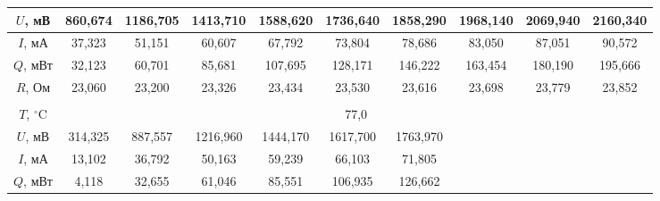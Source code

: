 \documentclass[a4paper, 12pt]{article}
\begin{document}
\begin{table}[H]
\begin{tabular}{|cccccccccc|}
                \multicolumn{1}{|c|}{$U$, мВ} & \multicolumn{1}{c|}{860,674} & \multicolumn{1}{c|}{1186,705} & \multicolumn{1}{c|}{1413,710} & \multicolumn{1}{c|}{1588,620} & \multicolumn{1}{c|}{1736,640} & \multicolumn{1}{c|}{1858,290} & \multicolumn{1}{c|}{1968,140} & \multicolumn{1}{c|}{2069,940} & \multicolumn{1}{c|}{2160,340} \\ \hline
                \multicolumn{1}{|c|}{$I$, мА} & \multicolumn{1}{c|}{37,323} & \multicolumn{1}{c|}{51,151}   & \multicolumn{1}{c|}{60,607} & \multicolumn{1}{c|}{67,792}   & \multicolumn{1}{c|}{73,804} & \multicolumn{1}{c|}{78,686}   & \multicolumn{1}{c|}{83,050} & \multicolumn{1}{c|}{87,051}   & \multicolumn{1}{c|}{90,572}   \\ \hline
                \multicolumn{1}{|c|}{$Q$, мВт} & \multicolumn{1}{c|}{32,123} & \multicolumn{1}{c|}{60,701}   & \multicolumn{1}{c|}{85,681} & \multicolumn{1}{c|}{107,695}  & \multicolumn{1}{c|}{128,171} & \multicolumn{1}{c|}{146,222}  & \multicolumn{1}{c|}{163,454} & \multicolumn{1}{c|}{180,190}  & \multicolumn{1}{c|}{195,666}  \\ \hline
                \multicolumn{1}{|c|}{$R$, Ом} & \multicolumn{1}{c|}{23,060} & \multicolumn{1}{c|}{23,200} & \multicolumn{1}{c|}{23,326} & \multicolumn{1}{c|}{23,434} & \multicolumn{1}{c|}{23,530} & \multicolumn{1}{c|}{23,616} & \multicolumn{1}{c|}{23,698} & \multicolumn{1}{c|}{23,779} & \multicolumn{1}{c|}{23,852} \\ \hline
                \multicolumn{10}{|c|}{} \\ \hline
                \multicolumn{1}{|c|}{$T$, $^\circ$C} & \multicolumn{9}{c|}{77,0} \\ \hline
                \multicolumn{1}{|c|}{$U$, мВ} & \multicolumn{1}{c|}{314,325} & \multicolumn{1}{c|}{887,557} & \multicolumn{1}{c|}{1216,960} & \multicolumn{1}{c|}{1444,170} & \multicolumn{1}{c|}{1617,700} & \multicolumn{1}{c|}{1763,970} & \multicolumn{1}{c|}{} & \multicolumn{1}{c|}{} & \multicolumn{1}{c|}{} \\ \hline
                \multicolumn{1}{|c|}{$I$, мА} & \multicolumn{1}{c|}{13,102} & \multicolumn{1}{c|}{36,792} & \multicolumn{1}{c|}{50,163} & \multicolumn{1}{c|}{59,239} & \multicolumn{1}{c|}{66,103} & \multicolumn{1}{c|}{71,805} & \multicolumn{1}{c|}{} & \multicolumn{1}{c|}{} & \multicolumn{1}{c|}{} \\ \hline
                \multicolumn{1}{|c|}{$Q$, мВт} & \multicolumn{1}{c|}{4,118} & \multicolumn{1}{c|}{32,655} & \multicolumn{1}{c|}{61,046} & \multicolumn{1}{c|}{85,551} & \multicolumn{1}{c|}{106,935} & \multicolumn{1}{c|}{126,662} & \multicolumn{1}{c|}{} & \multicolumn{1}{c|}{} & \multicolumn{1}{c|}{} \\ \hline

\end{tabular}
\end{table}
\end{document}

